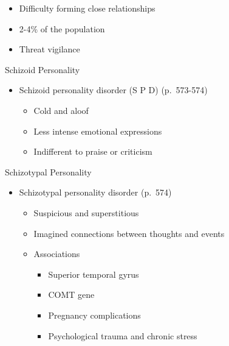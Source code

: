 \documentclass[
]{book}
\providecommand{\tightlist}{%
  \setlength{\itemsep}{0pt}\setlength{\parskip}{0pt}}
\begin{document}
\begin{reflect}
\begin{itemize}
  \begin{itemize}
  \tightlist
  \item
    Difficulty forming close relationships\\
  \item
    2-4\% of the population\\
  \item
    Threat vigilance
  \end{itemize}
\end{itemize}

Schizoid Personality

\begin{itemize}
\tightlist
\item
  Schizoid personality disorder (S P D) (p.~573-574)

  \begin{itemize}
  \tightlist
  \item
    Cold and aloof\\
  \item
    Less intense emotional expressions\\
  \item
    Indifferent to praise or criticism
  \end{itemize}
\end{itemize}

Schizotypal Personality

\begin{itemize}
\tightlist
\item
  Schizotypal personality disorder (p.~574)

  \begin{itemize}
  \tightlist
  \item
    Suspicious and superstitious\\
  \item
    Imagined connections between thoughts and events\\
  \item
    Associations

    \begin{itemize}
    \tightlist
    \item
      Superior temporal gyrus\\
    \item
      COMT gene\\
    \item
      Pregnancy complications\\
    \item
      Psychological trauma and chronic stress
    \end{itemize}
  \end{itemize}
\end{itemize}


\end{reflect}
\end{document}
